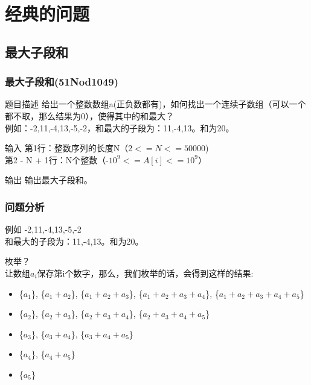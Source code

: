 \documentclass{beamer}
\begin{document}
\section{经典的问题}

\subsection{最大子段和}
\begin{frame}
\frametitle{最大子段和(51Nod1049)}
\begin{block}{题目描述}
给出一个整数数组a(正负数都有)，如何找出一个连续子数组（可以一个都不取，那么结果为0），使得其中的和最大？\\
例如：-2,11,-4,13,-5,-2，和最大的子段为：11,-4,13。和为20。
\end{block}
\begin{block}{输入}
	第1行：整数序列的长度N（2$ <= N <= 50000$)\\
	第2 - N + 1行：N个整数（-$10^9 <= A[i] <= 10^9$）
\end{block}	
\begin{block}{输出}
	输出最大子段和。
\end{block}

\end{frame}

\begin{frame}[fragile]
\frametitle{问题分析}
\begin{block}{例如}
	-2,11,-4,13,-5,-2\\
	和最大的子段为：11,-4,13。和为20。 
\end{block}
	枚举？ \\
	让数组$a_i$保存第i个数字，那么，我们枚举的话，会得到这样的结果:\\
	\begin{itemize} \scriptsize
		\item \{$a_1$\}, \{$a_1+a_2$\}, \{$a_1+a_2+a_3$\}, \{$a_1+a_2+a_3+a_4$\}, \{$a_1+a_2+a_3+a_4+a_5$\} 
		\item \{$ a_2$\}, \{$ a_2+a_3$\}, \{$a_2+a_3+a_4$\}, \{$a_2+a_3+a_4+a_5$\} 
		\item \{$ a_3$\}, \{$ a_3+a_4$\}, \{$ a_3+a_4+a_5$\} 
		\item \{$a_4$\}, \{$a_4+a_5$\}
		\item \{$a_5$\} 
	\end{itemize}
\end{frame}
\end{document}
